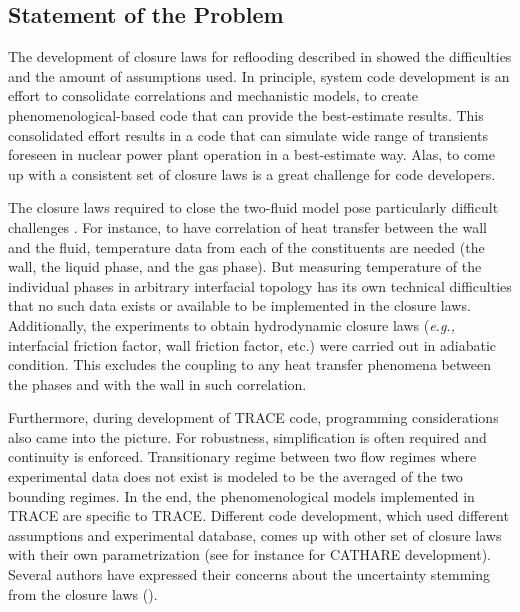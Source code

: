 \documentclass[11pt,titlepage]{article}
\begin{document}
\subsection{Statement of the Problem}

The development of closure laws for reflooding described in \cite{Nelson1992} showed the difficulties and the amount of assumptions used. 
In principle, system code development is an effort to consolidate correlations and mechanistic models, to create phenomenological-based code that can provide the best-estimate results. 
This consolidated effort results in a code that can simulate wide range of transients foreseen in nuclear power plant operation in a best-estimate way. 
Alas, to come up with a consistent set of closure laws is a great challenge for code developers.

The closure laws required to close the two-fluid model pose particularly difficult challenges \cite{Wulff2007}. 
For instance, to have correlation of heat transfer between the wall and the fluid, temperature data from each of the constituents are needed (the wall, the liquid phase, and the gas phase). 
But measuring temperature of the individual phases in arbitrary interfacial topology has its own technical difficulties that no such data exists or available to be implemented in the closure laws.
Additionally, the experiments to obtain hydrodynamic closure laws (\textit{e.g.,} interfacial friction factor, wall friction factor, etc.) were carried out in adiabatic condition. 
This excludes the coupling to any heat transfer phenomena between the phases and with the wall in such correlation. 

Furthermore, during development of TRACE code, programming considerations also came into the picture. 
For robustness, simplification is often required and continuity is enforced. 
Transitionary regime between two flow regimes where experimental data does not exist is modeled to be the averaged of the two bounding regimes. 
In the end, the phenomenological models implemented in TRACE are specific to TRACE. 
Different code development, which used different assumptions and experimental database, comes up with other set of closure laws with their own parametrization (see for instance \cite{Bestion1990} for CATHARE development). 
Several authors have expressed their concerns about the uncertainty stemming from the closure laws (\cite{Wulff2007, DAuria2012, Petruzzi2008}).
\end{document}
